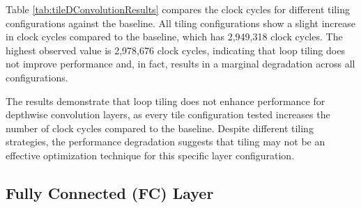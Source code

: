 \begin{table}[H]
\centering
\caption{Loop tiling result}
\label{tab:tileDConvolutionResults}
\end{table}

Table \ref{tab:tileDConvolutionResults} compares the clock cycles for different tiling configurations against the baseline. All tiling configurations show a slight increase in clock cycles compared to the baseline, which has 2,949,318 clock cycles. The highest observed value is 2,978,676 clock cycles, indicating that loop tiling does not improve performance and, in fact, results in a marginal degradation across all configurations.

The results demonstrate that loop tiling does not enhance performance for depthwise convolution layers, as every tile configuration tested increases the number of clock cycles compared to the baseline. Despite different tiling strategies, the performance degradation suggests that tiling may not be an effective optimization technique for this specific layer configuration.

\subsection{Fully Connected (FC) Layer}

